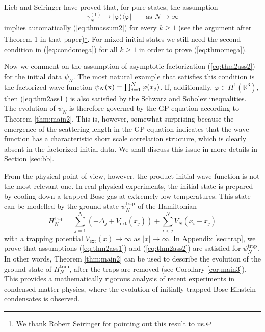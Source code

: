 \documentclass[11pt]{article}
\newcommand{\Htrap}{H_N^{\text{trap}}}
\newcommand{\Vtrap}{V_{\text{ext}}}
\newcommand{\psitrap}{\psi_N^{\text{trap}}}
\newcommand{\bx}{{\bf x}}
\newcommand{\ph}{\varphi}
\newcommand{\bR}{{\mathbb R}}
\begin{document}
\bigskip

Lieb and Seiringer  \cite{LS} have proved that, for pure states, the
assumption
\[ \gamma^{(1)}_{N} \to |\ph \rangle \langle \ph|
\qquad \text{as } N \to \infty
\]
implies automatically (\ref{eq:thmassum2}) for every $k \geq 1$ (see
the argument after Theorem 1 in that paper)\footnote{We thank Robert
Seiringer for pointing out this result to us.}. For mixed initial
states we still need the second condition in (\ref{eq:condomega})
for all $k \geq 1$ in order to prove (\ref{eq:thmomega}).

\bigskip

Now we  comment on the assumption of asymptotic factorization
(\ref{eq:thm2ass2}) for the initial data $\psi_N$. The most natural
example that satisfies this condition is the factorized wave
function $\psi_N (\bx) = \prod_{j=1}^N \ph (x_j)$. If, additionally,
 $\ph \in H^1 (\bR^3)$, then
(\ref{eq:thm2ass1}) is also satisfied by the Schwarz  and
Sobolev inequalities. The evolution of $\psi_N$
is therefore governed by the GP equation according to
 Theorem \ref{thm:main2}.
 This is, however, somewhat surprising because the emergence
of the scattering length in the GP equation indicates that the wave
function has a characteristic short scale correlation structure,
which is clearly absent in the factorized initial data.  We
shall discuss this issue in more details in Section \ref{sec:bb}.


\medskip

{F}rom the  physical point of view, however, the product initial
wave function is not the most relevant one. In real physical
experiments, the initial state is prepared by cooling down a trapped
Bose gas at extremely low temperatures. This state can be modelled
by the ground state $\psitrap$ of the Hamiltonian
\[ \Htrap = \sum_{j=1}^N \left(-\Delta_j + \Vtrap (x_j) \right) +
\sum_{i<j}^N V_N (x_i -x_j)\] with a trapping potential $\Vtrap (x)
\to \infty$ as $|x| \to \infty$.
In Appendix \ref{sec:trap}, we prove that
assumptions  (\ref{eq:thm2ass1}) and  (\ref{eq:thm2ass2})
are satisfied for $\psitrap$.
In other words, Theorem
\ref{thm:main2} can be used to describe the evolution of the ground
state of $\Htrap$, after the traps are removed (see Corollary
\ref{cor:main3}). This provides a mathematically rigorous analysis
of recent experiments in condensed matter physics, where the
evolution of initially trapped Bose-Einstein condensates is
observed.

\medskip
\end{document}
